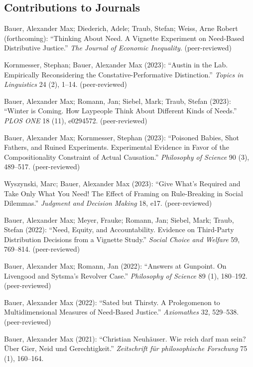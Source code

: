 \documentclass[a4paper,10pt]{article}
\newenvironment{literature}{%
   \parskip6pt\parindent0pt\raggedright
   \def\lititem{\hangindent=1cm\hangafter1}}{%
   \par\ignorespaces}
\begin{document}
\subsection*{Contributions to Journals}
\begin{literature}
\lititem Bauer, Alexander Max; Diederich, Adele; Traub, Stefan; Weiss, Arne Robert (forthcoming): \enquote{Thinking About Need. A Vignette Experiment on Need-Based Distributive Justice.} \textit{The Journal of Economic Inequality}. (peer-reviewed)

\lititem Kornmesser, Stephan; Bauer, Alexander Max (2023): \enquote{Austin in the Lab. Empirically Reconsidering the Constative-Performative Distinction.} \textit{Topics in Linguistics} 24 (2), 1--14. (peer-reviewed)

\lititem Bauer, Alexander Max; Romann, Jan; Siebel, Mark; Traub, Stefan (2023): \enquote{Winter is Coming. How Laypeople Think About Different Kinds of Needs.} \textit{PLOS ONE} 18 (11), e0294572. (peer-reviewed)

\lititem Bauer, Alexander Max; Kornmesser, Stephan (2023): \enquote{Poisoned Babies, Shot Fathers, and Ruined Experiments. Experimental Evidence in Favor of the Compositionality Constraint of Actual Causation.} \textit{Philosophy of Science} 90 (3), 489--517. (peer-reviewed)

\lititem Wyszynski, Marc; Bauer, Alexander Max (2023): \enquote{Give What's Required and Take Only What You Need! The Effect of Framing on Rule-Breaking in Social Dilemmas.} \textit{Judgment and Decision Making} 18, e17. (peer-reviewed)

\lititem Bauer, Alexander Max; Meyer, Frauke; Romann, Jan; Siebel, Mark; Traub, Stefan (2022): \enquote{Need, Equity, and Accountability. Evidence on Third-Party Distribution Decisions from a Vignette Study.} \textit{Social Choice and Welfare} 59, 769--814. (peer-reviewed)

\lititem Bauer, Alexander Max; Romann, Jan (2022): \enquote{Answers at Gunpoint. On Livengood and Sytsma's Revolver Case.} \textit{Philosophy of Science} 89 (1), 180--192. (peer-reviewed)

\lititem Bauer, Alexander Max (2022): \enquote{Sated but Thirsty. A Prolegomenon to Multidimensional Measures of Need-Based Justice.} \textit{Axiomathes} 32, 529--538. (peer-reviewed)

\lititem Bauer, Alexander Max (2021): \enquote{Christian Neuhäuser. Wie reich darf man sein? Über Gier, Neid und Gerechtigkeit.} \textit{Zeitschrift für philosophische Forschung} 75 (1), 160--164.


\end{literature}
\end{document}

